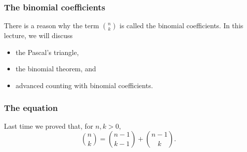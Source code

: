 

\begin{frame}\frametitle{The binomial coefficients}
  There is a reason why the term $\binom{n}{k}$ is called the binomial
  coefficients.  In this lecture, we will discuss
  \begin{itemize}
  \item the Pascal's triangle, 
  \item the binomial theorem, and
  \item advanced counting with binomial coefficients.
  \end{itemize}
\end{frame}

\begin{frame}\frametitle{The equation}
  Last time we proved that, for $n,k>0$,
  \[\binom{n}{k} = \binom{n-1}{k-1} + \binom{n-1}{k}.\]
\end{frame}

